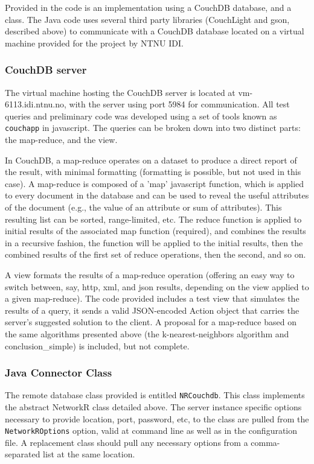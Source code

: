 Provided in the code is an implementation using a CouchDB database, and a class. The Java code uses several third party libraries (CouchLight and gson, described above) to communicate with a CouchDB database located on a virtual machine provided for the project by NTNU IDI.

\subsubsection{CouchDB server}
The virtual machine hosting the CouchDB server is located at vm-6113.idi.ntnu.no, with the server using port 5984 for communication. All test queries and preliminary code was developed using a set of tools known as \texttt{couchapp} in javascript. The queries can be broken down into two distinct parts: the map-reduce, and the view. 

In CouchDB, a map-reduce operates on a dataset to produce a direct report of the result, with minimal formatting (formatting is possible, but not used in this case). A  map-reduce is composed of a 'map' javascript function, which is applied to every document in the database and can be used to reveal the useful attributes of the document (e.g., the value of an attribute or sum of attributes). This resulting list can be sorted, range-limited, etc. The reduce function is applied to initial results of the associated map function (required), and combines the results in a recursive fashion, the function will be applied to the initial results, then the combined results of the first set of reduce operations, then the second, and so on. 

A view formats the results of a map-reduce operation (offering an easy way to switch between, say, http, xml, and json results, depending on the view applied to a given map-reduce).
The code provided includes a test view that simulates the results of a query, it sends a valid JSON-encoded Action object that carries the server's suggested solution to the client. A proposal for a map-reduce based on the same algorithms presented above (the k-nearest-neighbors algorithm and conclusion\_simple) is included, but not complete.


\subsubsection{Java Connector Class}
The remote database class provided is entitled \texttt{NRCouchdb}. This class implements the abstract NetworkR class detailed above. The server instance specific options necessary to provide location, port, password, etc, to the class are pulled from the \texttt{NetworkROptions} option, valid at command line as well as in the configuration file. A replacement class should pull any necessary options from a comma-separated list at the same location.

